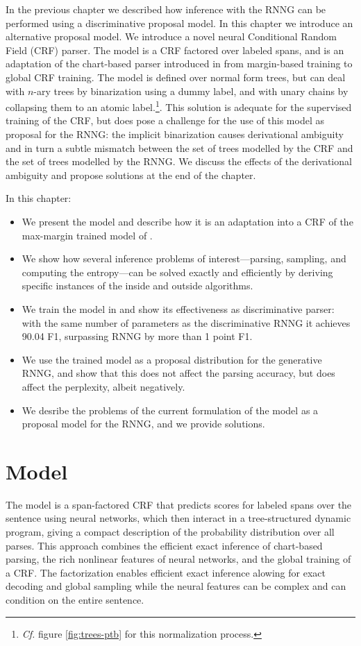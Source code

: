 In the previous chapter we described how inference with the RNNG can be performed using a discriminative proposal model. In this chapter we introduce an alternative proposal model. We introduce a novel neural Conditional Random Field (CRF) parser. The model is a CRF factored over labeled spans, and is an adaptation of the chart-based parser introduced in \citet{stern2017minimal} from margin-based training to global CRF training. The model is defined over normal form trees, but can deal with $n$-ary trees by binarization using a dummy label, and with unary chains by collapsing them to an atomic label.\footnote{\textit{Cf.} figure \ref{fig:trees-ptb} for this normalization process.}. This solution is adequate for the supervised training of the CRF, but does pose a challenge for the use of this model as proposal for the RNNG: the implicit binarization causes derivational ambiguity and in turn a subtle mismatch between the set of trees modelled by the CRF and the set of trees modelled by the RNNG. We discuss the effects of the derivational ambiguity and propose solutions at the end of the chapter.

In this chapter:
\begin{itemize}
  \item We present the model and describe how it is an adaptation into a CRF of the max-margin trained model of \citet{stern2017minimal}.
  \item We show how several inference problems of interest---parsing, sampling, and computing the entropy---can be solved exactly and efficiently by deriving specific instances of the inside and outside algorithms.
  \item We train the model in and show its effectiveness as discriminative parser: with the same number of parameters as the discriminative RNNG it achieves 90.04 F1, surpassing RNNG by more than 1 point F1.
  \item We use the trained model as a proposal distribution for the generative RNNG, and show that this does not affect the parsing accuracy, but does affect the perplexity, albeit negatively.
  \item We desribe the problems of the current formulation of the model as a proposal model for the RNNG, and we provide solutions.
\end{itemize}

\section{Model}
   The model is a span-factored CRF that predicts scores for labeled spans over the sentence using neural networks, which then interact in a tree-structured dynamic program, giving a compact description of the probability distribution over all parses. This approach combines the efficient exact inference of chart-based parsing, the rich nonlinear features of neural networks, and the global training of a CRF. The factorization enables efficient exact inference alowing for exact decoding and global sampling while the neural features can be complex and can condition on the entire sentence.

